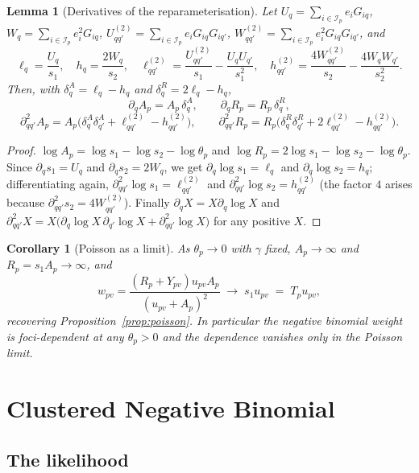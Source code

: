 \documentclass[11pt,a4paper]{article}
\theoremstyle{plain}
\newtheorem{lemma}[proposition]{Lemma}
\newtheorem{corollary}[proposition]{Corollary}
\theoremstyle{definition}
\newcommand{\E}{\mathcal{I}}
\begin{document}
\begin{lemma}[Derivatives of the reparameterisation]\label{lem:nb-RA-derivs}
Let $U_q = \sum_{i\in\E_p} e_iG_{iq}$, $W_q = \sum_{i\in\E_p} e_i^2G_{iq}$,
$U^{(2)}_{qq'} = \sum_{i\in\E_p} e_iG_{iq}G_{iq'}$,
$W^{(2)}_{qq'} = \sum_{i\in\E_p} e_i^2G_{iq}G_{iq'}$, and
\[
  \ell_q = \frac{U_q}{s_1},\quad
  h_q = \frac{2W_q}{s_2},\quad
  \ell^{(2)}_{qq'} = \frac{U^{(2)}_{qq'}}{s_1} - \frac{U_qU_{q'}}{s_1^2},\quad
  h^{(2)}_{qq'} = \frac{4W^{(2)}_{qq'}}{s_2} - \frac{4W_qW_{q'}}{s_2^2} .
\]
Then, with $\delta^A_q = \ell_q - h_q$ and $\delta^R_q = 2\ell_q - h_q$,
\[
  \partial_q A_p = A_p\,\delta^A_q, \qquad
  \partial_q R_p = R_p\,\delta^R_q,
\]
\[
  \partial^2_{qq'} A_p = A_p\bigl(\delta^A_q\delta^A_{q'} + \ell^{(2)}_{qq'} - h^{(2)}_{qq'}\bigr),
  \qquad
  \partial^2_{qq'} R_p = R_p\bigl(\delta^R_q\delta^R_{q'} + 2\ell^{(2)}_{qq'} - h^{(2)}_{qq'}\bigr).
\]
\end{lemma}

\begin{proof}
$\log A_p = \log s_1 - \log s_2 - \log\theta_p$ and $\log R_p = 2\log s_1 - \log s_2 -
\log\theta_p$. Since $\partial_q s_1 = U_q$ and $\partial_q s_2 = 2W_q$, we get
$\partial_q \log s_1 = \ell_q$ and $\partial_q \log s_2 = h_q$; differentiating again,
$\partial^2_{qq'}\log s_1 = \ell^{(2)}_{qq'}$ and $\partial^2_{qq'} \log s_2 = h^{(2)}_{qq'}$
(the factor $4$ arises because $\partial^2_{qq'} s_2 = 4W^{(2)}_{qq'}$). Finally
$\partial_q X = X \partial_q \log X$ and
$\partial^2_{qq'} X = X\bigl(\partial_q\log X\, \partial_{q'}\log X + \partial^2_{qq'}\log X\bigr)$
for any positive $X$.
\end{proof}

\begin{corollary}[Poisson as a limit]
As $\theta_p \to 0$ with $\gamma$ fixed, $A_p \to \infty$ and $R_p = s_1 A_p \to\infty$, and
\[
  w_{pv} = \frac{(R_p+Y_{pv})u_{pv}A_p}{(u_{pv}+A_p)^2}
   \;\longrightarrow\; s_1 u_{pv} \;=\; T_p u_{pv},
\]
recovering Proposition~\ref{prop:poisson}. In particular the negative binomial weight is
foci-dependent at any $\theta_p > 0$ and the dependence vanishes only in the Poisson limit.
\end{corollary}

\section{Clustered Negative Binomial}

\subsection{The likelihood}
\end{document}
